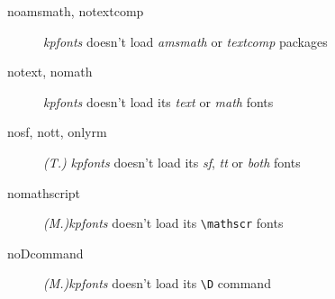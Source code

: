 \documentclass[a4paper,11pt]{article}
\begin{document}
\begin{description}
  \item[noamsmath, notextcomp]\textit{kpfonts} doesn't load \textit{amsmath} or \textit{textcomp} packages
  \item[notext, nomath]\textit{kpfonts} doesn't load its \textit{text} or \textit{math} fonts
  \item[nosf, nott, onlyrm]\textit{(T.)}\quad 
       \textit{kpfonts} doesn't load its \textit{sf}, \textit{tt} or \textit{both} fonts
  \item[nomathscript]\textit{(M.)}\quad\textit{kpfonts} doesn't load its \verb=\mathscr= fonts
  \item[noDcommand]\textit{(M.)}\quad\textit{kpfonts} doesn't load its \verb=\D= command
\end{description}

\vfill\vfill\vfill
{}
\end{document}
